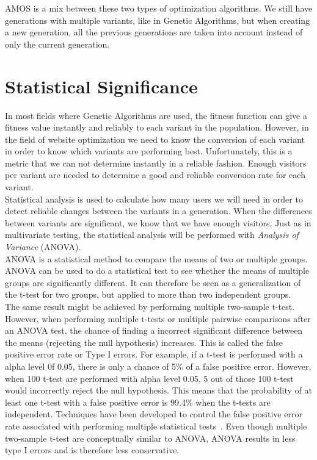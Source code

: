 \documentclass{report}
\begin{document}
AMOS is a mix between these two types of optimization algorithms. We still have generations with multiple variants, like in Genetic Algorithms, but when creating a new generation, all the previous generations are taken into account instead of only the current generation.

\section{Statistical Significance}
In most fields where Genetic Algorithms are used, the fitness function can give a fitness value instantly and reliably to each variant in the population. However, in the field of website optimization we need to know the conversion of each variant in order to know which variants are performing best. Unfortunately, this is a metric that we can not determine instantly in a reliable fashion. Enough visitors per variant are needed to determine a good and reliable conversion rate for each variant.\\

Statistical analysis is used to calculate how many users we will need in order to detect reliable changes between the variants in a generation. When the differences between variants are significant, we know that we have enough visitors. Just as in multivariate testing, the statistical analysis will be performed with \textit{Analysis of Variance} (ANOVA).\\

ANOVA is a statistical method to compare the means of two or multiple groups. ANOVA can be used to do a statistical test to see whether the means of multiple groups are significantly different. It can therefore be seen as a generalization of the t-test for two groups, but applied to more than two independent groups.~\cite{gelman2005analysis}\\

The same result might be achieved by performing multiple two-sample t-test. However, when performing multiple t-tests or multiple pairwise comparisons after an ANOVA test, the chance of finding a incorrect significant difference between the means (rejecting the null hypothesis) increases. This is called the false positive error rate or Type I errors. For example, if a t-test is performed with a alpha level 0f 0.05, there is only a chance of 5\% of a false positive error. However, when 100 t-test are performed with alpha level 0.05, 5 out of those 100 t-test would incorrectly reject the null hypothesis. This means that the probability of at least one t-test with a false positive error is 99.4\% when the t-tests are independent. Techniques have been developed to control the false positive error rate associated with performing multiple statistical tests~\cite{westfall1993resampling}. Even though multiple two-sample t-test are conceptually similar to ANOVA, ANOVA results in less type I errors and is therefore less conservative.~\cite{miller2013analysis}\\
\end{document}
